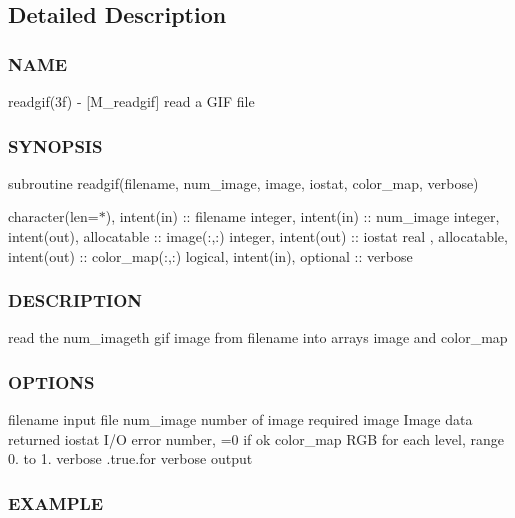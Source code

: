 \subsection{Detailed Description}
\subsubsection*{N\+A\+ME}

readgif(3f) -\/ \mbox{[}M\+\_\+readgif\mbox{]} read a G\+IF file 

\subsubsection*{S\+Y\+N\+O\+P\+S\+IS}

subroutine readgif(filename, num\+\_\+image, image, iostat, color\+\_\+map, verbose)

character(len=$\ast$), intent(in) \+:\+: filename integer, intent(in) \+:\+: num\+\_\+image integer, intent(out), allocatable \+:\+: image(\+:,\+:) integer, intent(out) \+:\+: iostat real , allocatable, intent(out) \+:\+: color\+\_\+map(\+:,\+:) logical, intent(in), optional \+:\+: verbose

\subsubsection*{D\+E\+S\+C\+R\+I\+P\+T\+I\+ON}

read the num\+\_\+image\textquotesingle{}th gif image from filename into arrays image and color\+\_\+map

\subsubsection*{O\+P\+T\+I\+O\+NS}

filename input file num\+\_\+image number of image required image Image data returned iostat I/O error number, =0 if ok color\+\_\+map R\+GB for each level, range 0. to 1. verbose .true.\+for verbose output

\subsubsection*{E\+X\+A\+M\+P\+LE}

